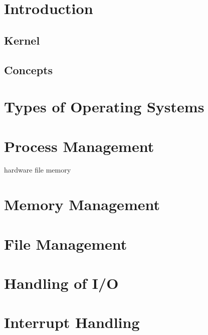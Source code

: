 \documentclass{article}
\begin{document}
	\section{Introduction}
	\subsection{Kernel}
	\subsection{Concepts}
	\section{Types of Operating Systems}
	\section{Process Management} hardware file memory
	\section{Memory Management}
	\section{File Management}
	\section{Handling of I/O}
	\section{Interrupt Handling}
	
\end{document}
